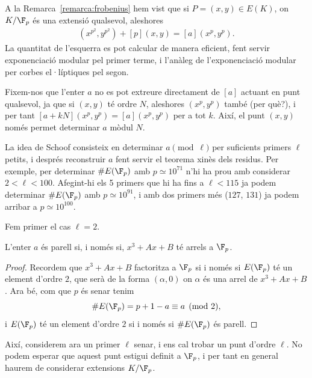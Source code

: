  A la Remarca~\ref{remarca:frobenius} hem vist que si $P=(x,y)\in E(K)$, on $K/\F_p$ és una extensió qualsevol, aleshores
 \begin{align}
 \label{eq:frobenius-schoof}
 (x^{p^2},y^{p^2}) + [p] (x,y) = [a] (x^p,y^p).
 \end{align}
 La quantitat de l'esquerra es pot calcular de manera eficient, fent servir exponenciació modular pel primer terme, i l'anàleg de l'exponenciació modular per corbes el·líptiques pel segon.
 
 \begin{remark}
 Fixem-nos que l'enter $a$ no es pot extreure directament de $[a]$ actuant en punt qualsevol, ja que si $(x,y)$ té ordre $N$, aleshores $(x^p,y^p)$ també (per què?), i per tant $[a+kN](x^p,y^p)=[a](x^p,y^p)$ per a tot $k$. Així, el punt $(x,y)$ només permet determinar $a$ mòdul $N$. 
 \end{remark}
 
 La idea de Schoof consisteix en determinar $a\pmod \ell$ per suficients primers $\ell$ petits, i després reconstruir $a$ fent servir el teorema xinès dels residus. Per exemple, per determinar $\#E(\F_p)$ amb $p\simeq 10^{71}$ n'hi ha prou amb considerar $2<\ell<100$. Afegint-hi els 5 primers que hi ha fins a $\ell < 115$ ja podem determinar $\#E(\F_p)$ amb $p\simeq 10^{91}$, i amb dos primers més ($127$, $131$) ja podem arribar a $p\simeq 10^{100}$.

 Fem primer el cas $\ell=2$.
 \begin{lemma}
 L'enter $a$ és parell si, i només si, $x^3+Ax+B$ té arrels a $\F_p$.
 \end{lemma}
\begin{proof}
 Recordem que $x^3+Ax+B$ factoritza a $\F_p$ si i només si $E(\F_p)$ té un element d'ordre $2$, que serà de la forma $(\alpha,0)$ on $\alpha$ és una arrel de $x^3+Ax+B$. Ara bé, com que $p$ és senar tenim
 \[
 \# E(\F_p) = p+1-a\equiv a\pmod 2,
 \]
 i $E(\F_p)$ té un element d'ordre $2$ si i només si $\#E(\F_p)$ és parell.
 \end{proof}
 
 Així, considerem ara un primer $\ell$ senar, i ens cal trobar un punt d'ordre $\ell$. No podem esperar que aquest punt estigui definit a $\F_p$, i per tant en general haurem de considerar extensions $K/\F_p$. 
 
